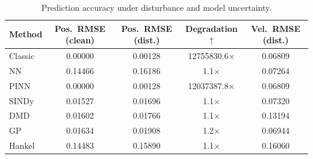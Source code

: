 \begin{table}[htbp]
\centering
\caption{Prediction accuracy under disturbance and model uncertainty.}
\label{tab:robustness}
\begin{tabular}{lcccc}
\toprule
Method & Pos.\ RMSE (clean) & Pos.\ RMSE (dist.) & Degradation $\uparrow$ & Vel.\ RMSE (dist.) \\
\midrule
Classic & 0.00000 & 0.00128 & 12755830.6$\times$ & 0.06809 \\
NN & 0.14466 & 0.16186 & 1.1$\times$ & 0.07264 \\
PINN & 0.00000 & 0.00128 & 12037387.8$\times$ & 0.06809 \\
SINDy & 0.01527 & 0.01696 & 1.1$\times$ & 0.07320 \\
DMD & 0.01602 & 0.01766 & 1.1$\times$ & 0.13194 \\
GP & 0.01634 & 0.01908 & 1.2$\times$ & 0.06944 \\
Hankel & 0.14483 & 0.15890 & 1.1$\times$ & 0.16060 \\
\bottomrule
\end{tabular}
\end{table}